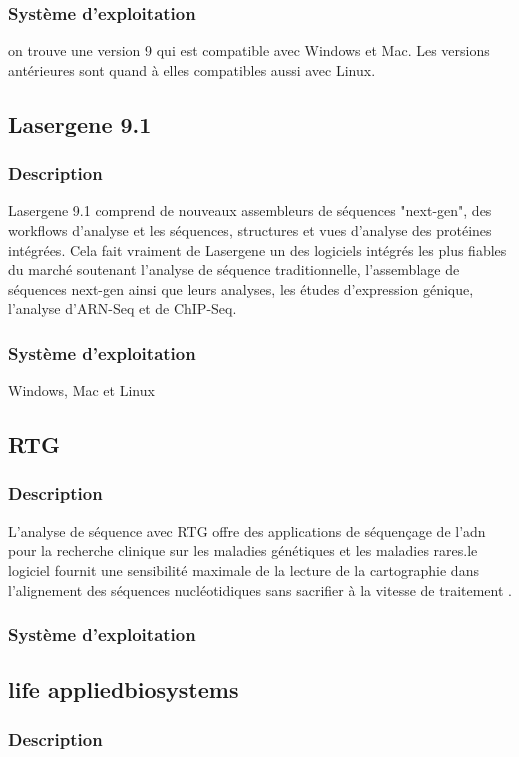 \subsubsection{Système d'exploitation}
on trouve une version 9 qui est compatible avec Windows et Mac. Les versions antérieures sont quand à elles compatibles aussi avec Linux.

\subsection{Lasergene 9.1}
\subsubsection{Description}
Lasergene 9.1 comprend de nouveaux assembleurs de séquences "next-gen", des workflows d'analyse et les séquences, structures et vues d'analyse des protéines intégrées. Cela fait  vraiment de Lasergene un des logiciels  intégrés les plus fiables du marché soutenant l'analyse de séquence traditionnelle, l'assemblage de séquences next-gen ainsi que leurs analyses, les études d'expression génique, l'analyse d'ARN-Seq et de ChIP-Seq.
\subsubsection{Système d'exploitation}
Windows, Mac et Linux
\subsection{RTG}
\subsubsection{Description}
L'analyse de séquence avec RTG offre des applications de séquençage de l'adn pour la recherche clinique sur les maladies génétiques et les maladies rares.le logiciel fournit une sensibilité maximale de la  lecture de la cartographie dans l'alignement des séquences nucléotidiques sans sacrifier à la vitesse de traitement .
\subsubsection{Système d'exploitation}

\subsection{life appliedbiosystems}
\subsubsection{Description}




